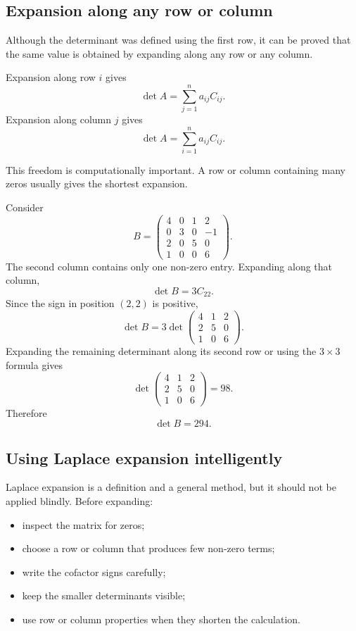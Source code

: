 \subsection{Expansion along any row or column}

Although the determinant was defined using the first row, it can be proved that the same value is obtained by expanding along any row or any column.

\begin{theorembox}
Expansion along row \(i\) gives
\[
\det A=\sum_{j=1}^{n}a_{ij}C_{ij}.
\]
Expansion along column \(j\) gives
\[
\det A=\sum_{i=1}^{n}a_{ij}C_{ij}.
\]
\end{theorembox}

This freedom is computationally important. A row or column containing many zeros usually gives the shortest expansion.

\begin{examplebox}
Consider
\[
B=\begin{pmatrix}
4&0&1&2\\
0&3&0&-1\\
2&0&5&0\\
1&0&0&6
\end{pmatrix}.
\]
The second column contains only one non-zero entry. Expanding along that column,
\[
\det B=3C_{22}.
\]
Since the sign in position \((2,2)\) is positive,
\[
\det B
=3\det\begin{pmatrix}
4&1&2\\
2&5&0\\
1&0&6
\end{pmatrix}.
\]
Expanding the remaining determinant along its second row or using the \(3\times3\) formula gives
\[
\det\begin{pmatrix}
4&1&2\\
2&5&0\\
1&0&6
\end{pmatrix}=98.
\]
Therefore
\[
\det B=294.
\]
\end{examplebox}

\subsection{Using Laplace expansion intelligently}

Laplace expansion is a definition and a general method, but it should not be applied blindly. Before expanding:
\begin{itemize}
\item inspect the matrix for zeros;
\item choose a row or column that produces few non-zero terms;
\item write the cofactor signs carefully;
\item keep the smaller determinants visible;
\item use row or column properties when they shorten the calculation.
\end{itemize}
